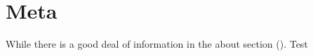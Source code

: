 \documentclass[../OpenAppliedMusicTheory.tex]{subfiles}
\begin{document}
    
    
    \section{Meta}\label{ch0.meta}
        While there is a good deal of information in the about section (). Test
\end{document}

